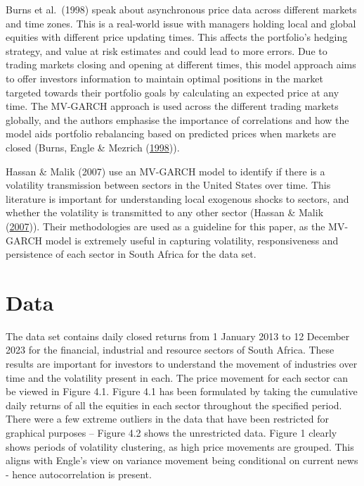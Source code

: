 \documentclass[11pt,preprint, authoryear]{elsarticle}
\numberwithin{equation}{section}
\numberwithin{figure}{section}
\numberwithin{table}{section}
\begin{document}
Burns et al.~(1998) speak about asynchronous price data across different
markets and time zones. This is a real-world issue with managers holding
local and global equities with different price updating times. This
affects the portfolio's hedging strategy, and value at risk estimates
and could lead to more errors. Due to trading markets closing and
opening at different times, this model approach aims to offer investors
information to maintain optimal positions in the market targeted towards
their portfolio goals by calculating an expected price at any time. The
MV-GARCH approach is used across the different trading markets globally,
and the authors emphasise the importance of correlations and how the
model aids portfolio rebalancing based on predicted prices when markets
are closed (Burns, Engle \& Mezrich
(\protect\hyperlink{ref-BurnsPatrick1998CaVo}{1998})).

Hassan \& Malik (2007) use an MV-GARCH model to identify if there is a
volatility transmission between sectors in the United States over time.
This literature is important for understanding local exogenous shocks to
sectors, and whether the volatility is transmitted to any other sector
(Hassan \& Malik (\protect\hyperlink{ref-HassanSyedAun2007MGmo}{2007})).
Their methodologies are used as a guideline for this paper, as the
MV-GARCH model is extremely useful in capturing volatility,
responsiveness and persistence of each sector in South Africa for the
data set.

\hypertarget{data}{%
\section{Data}\label{data}}

The data set contains daily closed returns from 1 January 2013 to 12
December 2023 for the financial, industrial and resource sectors of
South Africa. These results are important for investors to understand
the movement of industries over time and the volatility present in each.
The price movement for each sector can be viewed in Figure 4.1. Figure
4.1 has been formulated by taking the cumulative daily returns of all
the equities in each sector throughout the specified period. There were
a few extreme outliers in the data that have been restricted for
graphical purposes -- Figure 4.2 shows the unrestricted data. Figure 1
clearly shows periods of volatility clustering, as high price movements
are grouped. This aligns with Engle's view on variance movement being
conditional on current news - hence autocorrelation is present.
\end{document}
